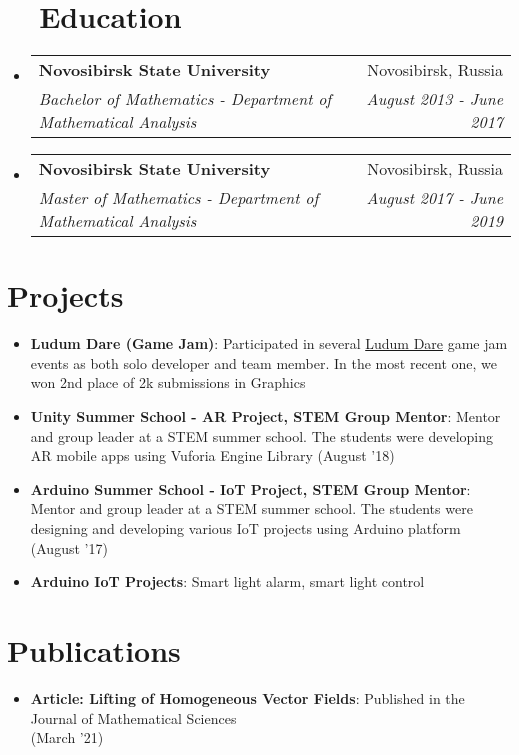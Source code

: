 \documentclass[a4paper,12pt]{extarticle}
\makeatletter
\newcommand{\resumeItem}[2]{
  \item\small{
    \textbf{#1}{: #2 \vspace{-2pt}}
  }
}
\newcommand{\resumeSubheading}[4]{
  \vspace{-1pt}\item
    \begin{tabular*}{0.97\textwidth}{l@{\extracolsep{\fill}}r}
      \textbf{#1} & #2 \\
      \textit{#3} & \textit{#4} \\
    \end{tabular*}\vspace{-5pt}
}
\newcommand{\resumeSubItem}[2]{\resumeItem{#1}{#2}\vspace{-3pt}}
\newcommand{\resumeSubHeadingListStart}{\begin{itemize}[leftmargin=*]}
\newcommand{\resumeSubHeadingListEnd}{\end{itemize}}
\makeatother
\begin{document}
\section{~~Education}
  \resumeSubHeadingListStart
    \resumeSubheading
      {Novosibirsk State University}{Novosibirsk, Russia}
      {Bachelor of Mathematics - Department of Mathematical Analysis}{August 2013 - June 2017}
    \resumeSubHeadingListEnd
\vspace{-15pt}
  \resumeSubHeadingListStart
    \resumeSubheading
      {Novosibirsk State University}{Novosibirsk, Russia}
      {Master of Mathematics - Department of Mathematical Analysis}{August 2017 - June 2019}
    \resumeSubHeadingListEnd

\vspace{-10pt}
\section{Projects}
\resumeSubHeadingListStart
\resumeSubItem{Ludum Dare (Game Jam)}{Participated in several \href{https://ldjam.com/}{Ludum Dare} game jam events as both solo developer and team member. In the most recent one, we won 2nd place of 2k submissions in Graphics}
\resumeSubItem{Unity Summer School - AR Project, STEM Group Mentor}{Mentor and group leader at a STEM summer school. The students were developing AR mobile apps using Vuforia Engine Library (August '18)}
\resumeSubItem{Arduino Summer School - IoT Project, STEM Group Mentor}{Mentor and group leader at a STEM summer school. The students were designing and developing various IoT projects using Arduino platform (August '17)}
\vspace{-15pt}
\resumeSubItem{Arduino IoT Projects}{Smart light alarm, smart light control}
\resumeSubHeadingListEnd
\vspace{-10pt}

\section{Publications}
\resumeSubHeadingListStart
\resumeSubItem{Article: Lifting of Homogeneous Vector Fields}{Published in the Journal of Mathematical Sciences \\ (March '21)}
\resumeSubHeadingListEnd
\vspace{-10pt}
\end{document}
